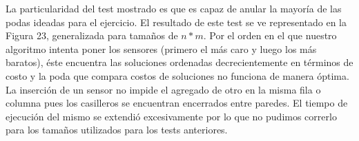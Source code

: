 La particularidad del test mostrado es que es capaz de anular la mayoría de las podas ideadas para el ejercicio. El resultado de este test se ve representado en la Figura 23, generalizada para tamaños de $n*m$. Por el orden en el que nuestro algoritmo intenta poner los sensores (primero el más caro y luego los más baratos), éste encuentra las soluciones ordenadas decrecientemente en términos de costo y la poda que compara costos de soluciones no funciona de manera óptima. La inserción de un sensor no impide el agregado de otro en la misma fila o columna pues los casilleros se encuentran encerrados entre paredes. El tiempo de ejecución del mismo se extendió excesivamente por lo que no pudimos correrlo para los tamaños utilizados para los tests anteriores.
